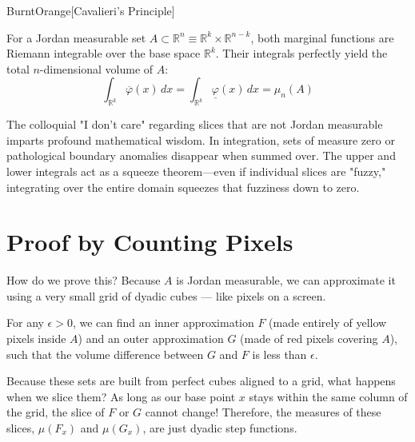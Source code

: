 \begin{color-box}{BurntOrange}[Cavalieri's Principle]
\begin{theorem}
For a Jordan measurable set $A \subset \mathbb{R}^n \equiv \mathbb{R}^k \times \mathbb{R}^{n-k}$, both marginal functions are Riemann integrable over the base space $\mathbb{R}^k$. Their integrals perfectly yield the total $n$-dimensional volume of $A$:
\[
\int_{\mathbb{R}^k} \overline{\varphi}(x) \, dx = \int_{\mathbb{R}^k} \underline{\varphi}(x) \, dx = \mu_n(A)
\]
\end{theorem}
\end{color-box}

\begin{didactic-insight}
The colloquial "I don't care" regarding slices that are not Jordan measurable imparts profound mathematical wisdom. In integration, sets of measure zero or pathological boundary anomalies disappear when summed over. The upper and lower integrals act as a squeeze theorem—even if individual slices are "fuzzy," integrating over the entire domain squeezes that fuzziness down to zero.
\end{didactic-insight}

\section{Proof by Counting Pixels}

\begin{spoken-clean}[00:46:30 - 00:52:00]
How do we prove this? Because $A$ is Jordan measurable, we can approximate it using a very small grid of dyadic cubes — like pixels on a screen. 

For any $\epsilon > 0$, we can find an inner approximation $F$ (made entirely of yellow pixels inside $A$) and an outer approximation $G$ (made of red pixels covering $A$), such that the volume difference between $G$ and $F$ is less than $\epsilon$.

Because these sets are built from perfect cubes aligned to a grid, what happens when we slice them? As long as our base point $x$ stays within the same column of the grid, the slice of $F$ or $G$ cannot change! Therefore, the measures of these slices, $\mu(F_x)$ and $\mu(G_x)$, are just dyadic step functions. 
\end{spoken-clean}

